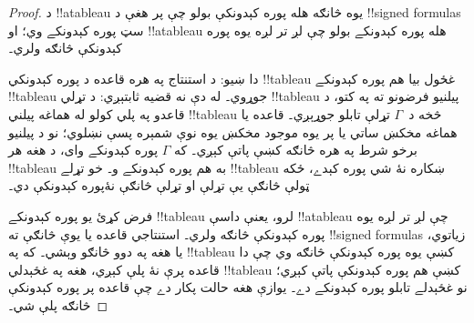 \documentclass[../../../include/open-logic-section]{subfiles}
\begin{document}
\begin{proof}
د !!a{tableau} يوه څانګه هله پوره کېدونکې بولو چې پر هغې د
!!{signed formula}s سټ پوره کېدونکے وي؛ او !!a{tableau} هله
پوره کېدونکے بولو چې لږ تر لږه يوه پوره کېدونکې څانګه ولري۔

دا ښيو: د استنتاج په هره قاعده د پوره کېدونکي !!{tableau}
غځول بيا هم پوره کېدونکے !!{tableau} جوړوي۔ له دې نه قضيه
ثابتېږي: د تړلي !!{tableau} پيلنيو فرضونو ته په کتو، د قاعدو
په پلي کولو له هماغه پيلني !!{tableau} څخه د~$\Gamma$ تړلې
تابلو جوړېږي۔ قاعده يا هماغه مخکښ ساتي يا پر يوه موجود
مخکښ يوه نوې شمېره پسې نښلوي؛ نو د پيلنيو برخو شرط په هره
څانګه کښې پاتې کېږي۔ که $\Gamma$ پوره کېدونکے وای، د هغه
هر !!{tableau} به هم پوره کېدونکے و۔ خو تړلے !!{tableau}
ښکاره نۀ شي پوره کېدے، ځکه ټولې څانګې يې تړلې او تړلې
څانګې نۀ‌پوره کېدونکې دي۔

فرض کړئ يو پوره کېدونکے !!{tableau} لرو، يعنې داسې
!!a{tableau} چې لږ تر لږه يوه پوره کېدونکې څانګه ولري۔
استنتاجي قاعده يا يوې څانګې ته !!{signed formula}s زياتوي، يا
هغه په دوو څانګو وېشي۔ که په !!{tableau} کښې يوه پوره کېدونکې
څانګه وي چې دا قاعده پرې نۀ پلې کېږي، هغه په غځېدلي
!!{tableau} کښې هم پوره کېدونکې پاتې کېږي؛ نو غځېدلے تابلو
پوره کېدونکے دے۔ يوازې هغه حالت پکار دے چې قاعده پر پوره
کېدونکې څانګه پلې شي۔


\end{proof}
\end{document}

